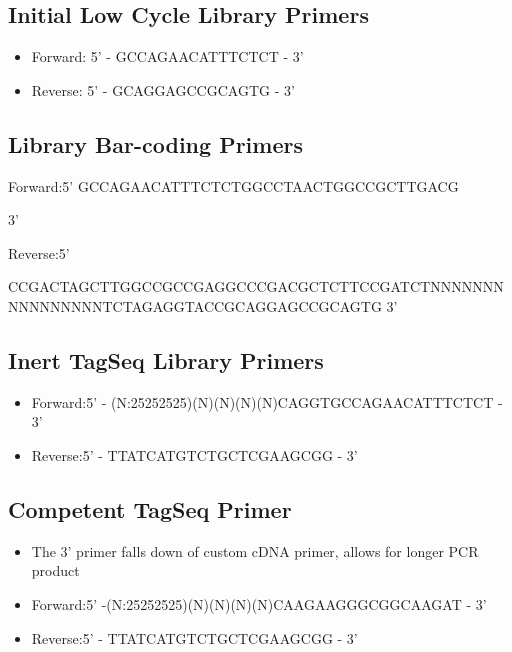\documentclass[a4paper]{article}
\begin{document}
	\subsection{Initial Low Cycle Library Primers}
    	
        \begin{itemize}
        
        	\item Forward: 5' - GCCAGAACATTTCTCT - 3'
            \item Reverse: 5' - GCAGGAGCCGCAGTG - 3'
        
        \end{itemize}      
   	
    \subsection{Library Bar-coding Primers}
    	
        \begin{itemize}
            
            \item Forward:5' \tiny{GCCAGAACATTTCTCTGGCCTAACTGGCCGCTTGACG} \normalsize{3'
          	\item Reverse:5'} \tiny{CCGACTAGCTTGGCCGCCGAGGCCCGACGCTCTTCCGATCTNNNNNNNNNNNNNNNNTCTAGAGGTACCGCAGGAGCCGCAGTG} \normalsize{3'}       
            
		\end{itemize}
        
   	\subsection{Inert TagSeq Library Primers}
        \begin{itemize}

			\item Forward:5' - (N:25252525)(N)(N)(N)(N)CAGGTGCCAGAACATTTCTCT  - 3'
        	\item Reverse:5' - TTATCATGTCTGCTCGAAGCGG - 3'
		        
        \end{itemize}
   \subsection{Competent TagSeq Primer}
        \begin{itemize}    
        	\item The 3' primer falls down of custom cDNA primer, allows for longer PCR product
            \item Forward:5' -(N:25252525)(N)(N)(N)(N)CAAGAAGGGCGGCAAGAT - 3'
        	\item Reverse:5' - TTATCATGTCTGCTCGAAGCGG - 3'
            
        \end{itemize}
\end{document}
